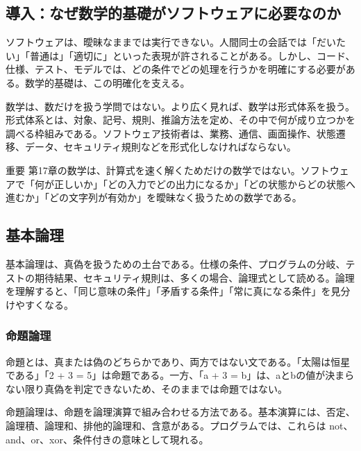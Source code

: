 \documentclass[a4paper,11pt]{ltjsarticle}
\numberwithin{figure}{section}
\numberwithin{table}{section}
\begin{document}
\subsection{導入：なぜ数学的基礎がソフトウェアに必要なのか}
ソフトウェアは、曖昧なままでは実行できない。人間同士の会話では「だいたい」「普通は」「適切に」といった表現が許されることがある。しかし、コード、仕様、テスト、モデルでは、どの条件でどの処理を行うかを明確にする必要がある。数学的基礎は、この明確化を支える。

数学は、数だけを扱う学問ではない。より広く見れば、数学は形式体系を扱う。形式体系とは、対象、記号、規則、推論方法を定め、その中で何が成り立つかを調べる枠組みである。ソフトウェア技術者は、業務、通信、画面操作、状態遷移、データ、セキュリティ規則などを形式化しなければならない。

\begin{notebox}{重要}
第17章の数学は、計算式を速く解くためだけの数学ではない。ソフトウェアで「何が正しいか」「どの入力でどの出力になるか」「どの状態からどの状態へ進むか」「どの文字列が有効か」を曖昧なく扱うための数学である。
\end{notebox}
\subsection{基本論理}
基本論理は、真偽を扱うための土台である。仕様の条件、プログラムの分岐、テストの期待結果、セキュリティ規則は、多くの場合、論理式として読める。論理を理解すると、「同じ意味の条件」「矛盾する条件」「常に真になる条件」を見分けやすくなる。

\subsubsection{命題論理}
命題とは、真または偽のどちらかであり、両方ではない文である。「太陽は恒星である」「2 + 3 = 5」は命題である。一方、「a + 3 = b」は、aとbの値が決まらない限り真偽を判定できないため、そのままでは命題ではない。

命題論理は、命題を論理演算で組み合わせる方法である。基本演算には、否定、論理積、論理和、排他的論理和、含意がある。プログラムでは、これらは not、and、or、xor、条件付きの意味として現れる。
\end{document}
